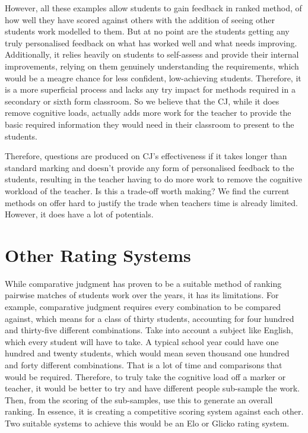 		However, all these examples allow students to gain feedback in ranked method, of how well they have scored against others with the addition of seeing other students work modelled to them. But at no point are the students getting any truly personalised feedback on what has worked well and what needs improving. Additionally, it relies heavily on students to self-assess and provide their internal improvements, relying on them genuinely understanding the requirements, which would be a meagre chance for less confident, low-achieving students. Therefore, it is a more superficial process and lacks any try impact for methods required in a secondary or sixth form classroom. So we believe that the CJ, while it does remove cognitive loads, actually adds more work for the teacher to provide the basic required information they would need in their classroom to present to the students. 
		
		Therefore, questions are produced on CJ's effectiveness if it takes longer than standard marking and doesn't provide any form of personalised feedback to the students, resulting in the teacher having to do more work to remove the cognitive workload of the teacher. Is this a trade-off worth making? We find the current methods on offer hard to justify the trade when teachers time is already limited. However, it does have a lot of potentials. %
		
	
	\section{Other Rating Systems}
		While comparative judgment has proven to be a suitable method of ranking pairwise matches of students work over the years, it has its limitations. For example, comparative judgment requires every combination to be compared against, which means for a class of thirty students, accounting for four hundred and thirty-five different combinations. Take into account a subject like English, which every student will have to take. A typical school year could have one hundred and twenty students, which would mean seven thousand one hundred and forty different combinations. That is a lot of time and comparisons that would be required. Therefore, to truly take the cognitive load off a marker or teacher, it would be better to try and have different people sub-sample the work. Then, from the scoring of the sub-samples, use this to generate an overall ranking. In essence, it is creating a competitive scoring system against each other. Two suitable systems to achieve this would be an Elo or Glicko rating system.
	
